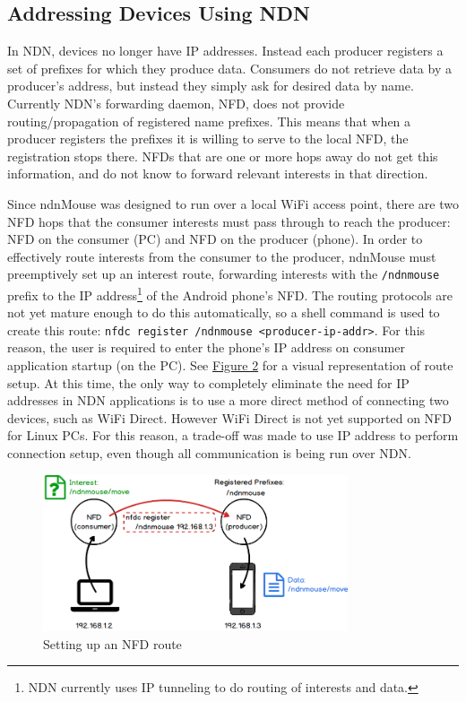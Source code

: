 \documentclass{sig-alternate}
\renewcommand\_{\textunderscore\allowbreak}  %
\begin{document}
\subsection{Addressing Devices Using NDN}
In NDN, devices no longer have IP addresses. Instead each producer registers a set of prefixes for which they produce data. Consumers do not retrieve data by a producer's address, but instead they simply ask for desired data by name. Currently NDN's forwarding daemon, NFD, does not provide routing/propagation of registered name prefixes. This means that when a producer registers the prefixes it is willing to serve to the local NFD, the registration stops there. NFDs that are one or more hops away do not get this information, and do not know to forward relevant interests in that direction.

Since ndnMouse was designed to run over a local WiFi access point, there are two NFD hops that the consumer interests must pass through to reach the producer: NFD on the consumer (PC) and NFD on the producer (phone). In order to effectively route interests from the consumer to the producer, ndnMouse must preemptively set up an interest route, forwarding interests with the \texttt{/ndnmouse} prefix to the IP address\footnote{NDN currently uses IP tunneling to do routing of interests and data.} of the Android phone's NFD. The routing protocols are not yet mature enough to do this automatically, so a shell command is used to create this route: \texttt{nfdc register /ndnmouse <producer-ip-addr>}. For this reason, the user is required to enter the phone's IP address on consumer application startup (on the PC). See \hyperlink{fig:routeSetup}{Figure 2} for a visual representation of route setup. At this time, the only way to completely eliminate the need for IP addresses in NDN applications is to use a more direct method of connecting two devices, such as WiFi Direct. However WiFi Direct is not yet supported on NFD for Linux PCs. For this reason, a trade-off was made to use IP address to perform connection setup, even though all communication is being run over NDN.

\begin{figure}
	\centering
	\hypertarget{fig:routeSetup}{}
	\includegraphics[width=9cm]{diagrams/routeSetup}
	\caption{Setting up an NFD route}
\end{figure}
\end{document}

